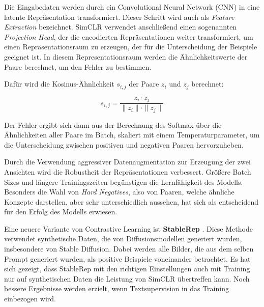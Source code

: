 Die Eingabedaten werden durch ein Convolutional Neural Network (CNN) in eine latente Repräsentation transformiert. Dieser Schritt wird auch als \textit{Feature Extraction} bezeichnet. SimCLR verwendet anschließend einen sogenannten \textit{Projection Head}, der die encodierten Repräsentationen weiter transformiert, um einen Repräsentationsraum zu erzeugen, der für die Unterscheidung der Beispiele geeignet ist. In diesem Representationsraum werden die Ähnlichkeitswerte der Paare berechnet, um den Fehler zu bestimmen.

Dafür wird die Kosinus-Ähnlichkeit $s_{i,j}$ der Paare $z_i$ und $z_j$ berechnet:

\begin{equation}
	s_{i,j} = \frac{z_i \cdot z_j}{\|z_i\| \cdot \|z_j\|}
	\label{eq:cosine-similarity}
\end{equation}

Der Fehler ergibt sich dann aus der Berechnung des Softmax über die Ähnlichkeiten aller Paare im Batch, skaliert mit einem Temperaturparameter, um die Unterscheidung zwischen positiven und negativen Paaren hervorzuheben.

Durch die Verwendung aggressiver Datenaugmentation zur Erzeugung der zwei Ansichten wird die Robustheit der Repräsentationen verbessert. Größere Batch Sizes und längere Trainingszeiten begünstigen die Lernfähigkeit des Modells. Besonders die Wahl von \textit{Hard Negatives}, also von Paaren, welche ähnliche Konzepte darstellen, aber sehr unterschiedlich aussehen, hat sich als entscheidend für den Erfolg des Modells erwiesen.

Eine neuere Variante von Contrastive Learning ist \textbf{StableRep} \parencite{Tian2023stablerep}. Diese Methode verwendet synthetische Daten, die von Diffusionsmodellen generiert wurden, insbesondere von Stable Diffusion. Dabei werden alle Bilder, die aus dem selben Prompt generiert wurden, als positive Beispiele voneinander betrachtet. Es hat sich gezeigt, dass StableRep mit den richtigen Einstellungen auch mit Training nur auf synthetischen Daten die Leistung von SimCLR übertreffen kann. Noch bessere Ergebnisse werden erzielt, wenn Textsupervision in das Training einbezogen wird.

